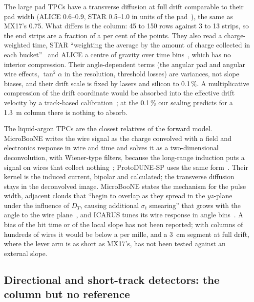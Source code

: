The large pad TPCs have a transverse diffusion at full drift comparable to their pad width (ALICE 0.6--0.9, STAR 0.5--1.0 in
units of the pad~\cite{Alme2010,Anderson2003}), the same as MX17's 0.75. What differs is the column: 45 to 150 rows against 3
to 13 strips, so the end strips are a fraction of a per cent of the points. They also read a charge-weighted time, STAR
``weighting the average by the amount of charge collected in each bucket''~\cite{Anderson2003} and ALICE a centre of gravity over
time bins~\cite{Alme2010}, which has no interior compression. Their angle-dependent terms (the angular pad and angular wire effects,
$\tan^2\alpha$ in the resolution, threshold losses) are variances, not slope biases, and their drift scale is fixed by lasers
and silicon to 0.1\,\%. A multiplicative compression of the drift coordinate would be absorbed into the effective drift
velocity by a track-based calibration~\cite{Alme2010}; at the 0.1\,\% our scaling predicts for a 1.3~m column there is nothing to
absorb.

The liquid-argon TPCs are the closest relatives of the forward model. MicroBooNE writes the wire signal as the charge
convolved with a field and electronics response in wire and time and solves it as a two-dimensional deconvolution, with
Wiener-type filters, because the long-range induction puts a signal on wires that collect nothing~\cite{Adams2018a,Adams2018b};
ProtoDUNE-SP uses the same form~\cite{ProtoDUNE2020}. Their kernel is the induced current, bipolar and calculated; the transverse
diffusion stays in the deconvolved image. MicroBooNE states the mechanism for the pulse width, adjacent clouds that ``begin to
overlap as they spread in the $yz$-plane under the influence of $D_T$, causing additional $\sigma_t$ smearing'' that grows with the
angle to the wire plane~\cite{MicroBooNE2021}, and ICARUS tunes its wire response in angle bins~\cite{ICARUS2024}. A bias of the
hit time or of the local slope has not been reported; with columns of hundreds of wires it would be below a per mille, and a
3~cm segment at full drift, where the lever arm is as short as MX17's, has not been tested against an external slope.

\subsection{Directional and short-track detectors: the column but no reference}

